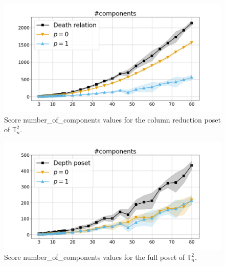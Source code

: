 \documentclass{article}
\begin{document}
    \begin{figure}[h!]
        \centering
        \hspace*{-0.24\textwidth}
        \includegraphics[width=1.4\textwidth]{pics/extended torus scores/score=number-of-components, dim=2, object=column reduction.png}
        \caption{Score number\_of\_components values for the column reduction poset of $\mathbb{T}_n^{2}$.}
        \label{fig:numberofcomponents-columnreduction2}
    \end{figure}
    \begin{figure}[h!]
        \centering
        \hspace*{-0.24\textwidth}
        \includegraphics[width=1.4\textwidth]{pics/extended torus scores/score=number-of-components, dim=2, object=full.png}
        \caption{Score number\_of\_components values for the full poset of $\mathbb{T}_n^{2}$.}
        \label{fig:numberofcomponents-full2}
    \end{figure}
\end{document}
